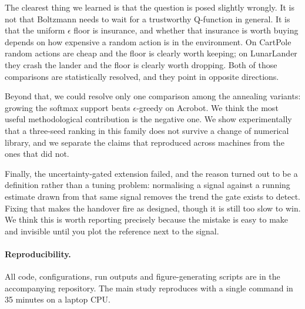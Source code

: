 \documentclass[11pt,a4paper]{article}
\begin{document}
The clearest thing we learned is that the question is posed slightly wrongly.
It is not that Boltzmann needs to wait for a trustworthy Q-function in general.
It is that the uniform $\epsilon$ floor is insurance, and whether that
insurance is worth buying depends on how expensive a random action is in the
environment. On CartPole random actions are cheap and the floor is clearly
worth keeping; on LunarLander they crash the lander and the floor is clearly
worth dropping. Both of those comparisons are statistically resolved, and they
point in opposite directions.

Beyond that, we could resolve only one comparison among the annealing variants:
growing the softmax support beats $\epsilon$-greedy on Acrobot. We think the
most useful methodological contribution is the negative one. We show
experimentally that a three-seed ranking in this family does not survive a
change of numerical library, and we separate the claims that reproduced across
machines from the ones that did not.

Finally, the uncertainty-gated extension failed, and the reason turned out to
be a definition rather than a tuning problem: normalising a signal against a
running estimate drawn from that same signal removes the trend the gate exists
to detect. Fixing that makes the handover fire as designed, though it is still
too slow to win. We think this is worth reporting precisely because the mistake
is easy to make and invisible until you plot the reference next to the signal.

\paragraph{Reproducibility.}
All code, configurations, run outputs and figure-generating scripts are in the
accompanying repository. The main study reproduces with a single command in 35
minutes on a laptop CPU.
\end{document}
